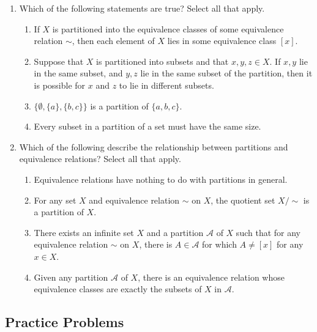 \begin{enumerate}
\item Which of the following statements are true? Select all that apply.
\begin{enumerate}
    \item If $X$ is partitioned into the equivalence classes of some equivalence relation $\sim$, then each element of $X$ lies in some equivalence class $[x]$.
    \item Suppose that $X$ is partitioned into subsets and that $x,y,z\in X$. If $x,y$ lie in the same subset, and $y,z$ lie in the same subset of the partition, then it is possible for $x$ and $z$ to lie in different subsets.
    \item $\{\emptyset, \{a\}, \{b,c\}\}$ is a partition of $\{a,b,c\}$.
    \item Every subset in a partition of a set must have the same size.
\end{enumerate}

\item Which of the following describe the relationship between partitions and equivalence relations? Select all that apply.
\begin{enumerate}
    \item Equivalence relations have nothing to do with partitions in general.
    \item For any set $X$ and equivalence relation $\sim$ on $X$, the quotient set $X/\sim$ is a partition of $X$.
    \item There exists an infinite set $X$ and a partition $\mathcal{A}$ of $X$ such that for any equivalence relation $\sim$ on $X$, there is $A \in \mathcal{A}$ for which $A \neq [x]$ for any $x \in X$.
    \item Given any partition $\mathcal{A}$ of $X$, there is an equivalence relation whose equivalence classes are exactly the subsets of $X$ in $\mathcal{A}$.
\end{enumerate}
\end{enumerate}

\subsection*{Practice Problems}

